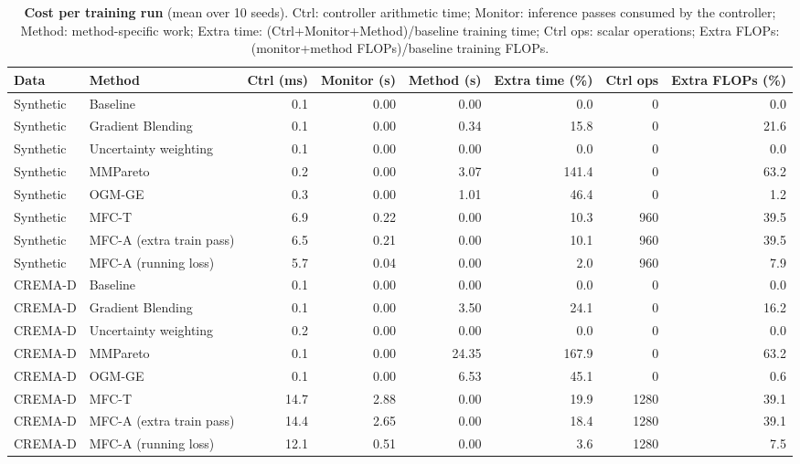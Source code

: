 \documentclass[fleqn,10pt]{wlscirep}
\begin{document}
\begin{table}[t]
\caption{\textbf{Cost per training run} (mean over 10 seeds). Ctrl: controller arithmetic time; Monitor: inference passes consumed by the controller; Method: method-specific work; Extra time: (Ctrl+Monitor+Method)/baseline training time; Ctrl ops: scalar operations; Extra FLOPs: (monitor+method FLOPs)/baseline training FLOPs.}
\label{tab:cost}
\centering
\footnotesize
\begin{tabular}{@{}llrrrrrr@{}}
\toprule
\textbf{Data} & \textbf{Method} & \textbf{Ctrl (ms)} & \textbf{Monitor (s)} & \textbf{Method (s)} & \textbf{Extra time (\%)} & \textbf{Ctrl ops} & \textbf{Extra FLOPs (\%)} \\ \midrule
Synthetic & Baseline & 0.1 & 0.00 & 0.00 & 0.0 & 0 & 0.0 \\
Synthetic & Gradient Blending & 0.1 & 0.00 & 0.34 & 15.8 & 0 & 21.6 \\
Synthetic & Uncertainty weighting & 0.1 & 0.00 & 0.00 & 0.0 & 0 & 0.0 \\
Synthetic & MMPareto & 0.2 & 0.00 & 3.07 & 141.4 & 0 & 63.2 \\
Synthetic & OGM-GE & 0.3 & 0.00 & 1.01 & 46.4 & 0 & 1.2 \\
Synthetic & MFC-T & 6.9 & 0.22 & 0.00 & 10.3 & 960 & 39.5 \\
Synthetic & MFC-A (extra train pass) & 6.5 & 0.21 & 0.00 & 10.1 & 960 & 39.5 \\
Synthetic & MFC-A (running loss) & 5.7 & 0.04 & 0.00 & 2.0 & 960 & 7.9 \\
CREMA-D & Baseline & 0.1 & 0.00 & 0.00 & 0.0 & 0 & 0.0 \\
CREMA-D & Gradient Blending & 0.1 & 0.00 & 3.50 & 24.1 & 0 & 16.2 \\
CREMA-D & Uncertainty weighting & 0.2 & 0.00 & 0.00 & 0.0 & 0 & 0.0 \\
CREMA-D & MMPareto & 0.1 & 0.00 & 24.35 & 167.9 & 0 & 63.2 \\
CREMA-D & OGM-GE & 0.1 & 0.00 & 6.53 & 45.1 & 0 & 0.6 \\
CREMA-D & MFC-T & 14.7 & 2.88 & 0.00 & 19.9 & 1280 & 39.1 \\
CREMA-D & MFC-A (extra train pass) & 14.4 & 2.65 & 0.00 & 18.4 & 1280 & 39.1 \\
CREMA-D & MFC-A (running loss) & 12.1 & 0.51 & 0.00 & 3.6 & 1280 & 7.5 \\
\bottomrule
\end{tabular}
\end{table}
\end{document}
